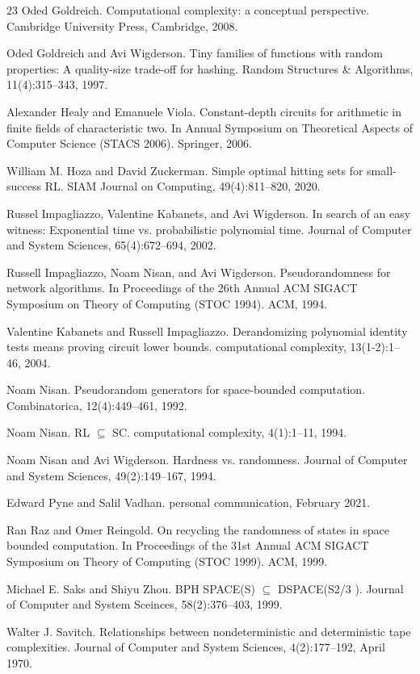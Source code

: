 \documentclass[10pt,a4paper]{article}
\begin{document}
\begin{thebibliography}{23}
Oded Goldreich. Computational complexity: a conceptual perspective. Cambridge University Press, Cambridge, 2008.

Oded Goldreich and Avi Wigderson. Tiny families of functions with random properties: A quality-size trade-off for hashing. Random Structures \& Algorithms, 11(4):315–343, 1997.

Alexander Healy and Emanuele Viola. Constant-depth circuits for arithmetic in finite fields of characteristic two. In Annual Symposium on Theoretical Aspects of Computer Science (STACS 2006). Springer, 2006.

William M. Hoza and David Zuckerman. Simple optimal hitting sets for small-success RL. SIAM Journal on Computing, 49(4):811–820, 2020.

Russel Impagliazzo, Valentine Kabanets, and Avi Wigderson. In search of an easy witness: Exponential time vs. probabilistic polynomial time. Journal of Computer and System Sciences, 65(4):672–694, 2002.

Russell Impagliazzo, Noam Nisan, and Avi Wigderson. Pseudorandomness for network algorithms. In Proceedings of the 26th Annual ACM SIGACT Symposium on Theory of Computing (STOC 1994). ACM, 1994.

Valentine Kabanets and Russell Impagliazzo. Derandomizing polynomial identity tests means proving circuit lower bounds. computational complexity, 13(1-2):1–46, 2004.

Noam Nisan. Pseudorandom generators for space-bounded computation. Combinatorica, 12(4):449–461, 1992.

Noam Nisan. RL \(\subseteq\) SC. computational complexity, 4(1):1–11, 1994.

Noam Nisan and Avi Wigderson. Hardness vs. randomness. Journal of Computer and System Sciences, 49(2):149–167, 1994.

Edward Pyne and Salil Vadhan. personal communication, February 2021.

Ran Raz and Omer Reingold. On recycling the randomness of states in space bounded computation. In Proceedings of the 31st Annual ACM SIGACT Symposium on Theory of Computing (STOC 1999). ACM, 1999.

Michael E. Saks and Shiyu Zhou. BPH SPACE(S) \(\subseteq\) DSPACE(S2/3 ). Journal of Computer and System Sceinces, 58(2):376–403, 1999.

Walter J. Savitch. Relationships between nondeterministic and deterministic tape complexities. Journal of Computer and System Sciences, 4(2):177–192, April 1970.
\end{thebibliography}
\end{document}

